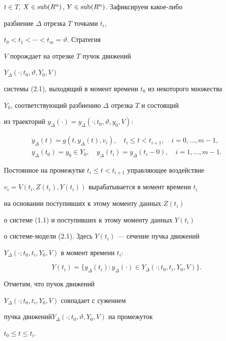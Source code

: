 $t\in T$, $X\in\operatorname{sub}(R^n)$, $Y\in\operatorname{sub}(R^n)$. Зафиксируем какое-либо 


разбиение $\Delta$ отрезка $T$ точками $t_i$, 


$t_0<t_1<\dotsb<t_m=\vartheta$. Стратегия 


$V$ порождает на отрезке $T$ пучок движений 


$Y_\Delta(\cdot;t_0,\vartheta,Y_0,V)$ 


системы (2.1), выходящий в момент времени $t_0$ из некоторого множества 


$Y_0$, соответствующий разбиению $\Delta$ отрезка $T$ и состоящий 


из траекторий $y_\Delta(\cdot)=y_\Delta(\cdot;t_0,\vartheta,y_0,V)$: 


\begin{gather*} 


\Dot y_\Delta(t)=g(t,y_\Delta(t),v_i),\quad 


t_i\le t<t_{i+1},\quad i=0,\dotsc,m-1,\\ 


y_\Delta(t_0)=y_0\in Y_0,\quad 


y_\Delta(t_i)=y_\Delta(t_i-0),\quad i=1,\dotsc,m-1. 


\end{gather*} 


Постоянное на промежутке $t_i\le t<t_{i+1}$ управляющее воздействие 


$v_i=V(t_i,Z(t_i),Y(t_i))$ вырабатывается в момент времени $t_i$ 


на основании поступивших к этому моменту данных $Z(t_i)$ 


о системе (1.1) и поступивших к этому моменту данных $Y(t_i)$ 


о системе-модели (2.1). Здесь $Y(t_i)$ --- сечение пучка движений 


$Y_\Delta(\cdot;t_0,t_i,Y_0,V)$ в момент времени $t_i$: 


$$ 


Y(t_i)=\{y_\Delta(t_i):y_\Delta(\cdot)\in Y_\Delta 


(\cdot;t_0,t_i,Y_0,V)\}. 


$$ 


Отметим, что пучок движений 


$Y_\Delta(\cdot;t_0,t_i,Y_0,V)$ совпадает с сужением 


пучка движений\linebreak $Y_\Delta(\cdot;t_0,\vartheta,Y_0,V)$ на промежуток 


$t_0\le t\le t_i$. 


